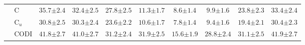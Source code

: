 \begin{table}[!h]
\begin{tabular}{ll c ccc ccc c}
 & C & $35.7 {\scriptstyle \pm 2.4}$ & $32.4 {\scriptstyle \pm 2.5}$ & $27.8 {\scriptstyle \pm 2.5}$ & $11.3 {\scriptstyle \pm 1.7}$ & $8.6 {\scriptstyle \pm 1.4}$ & $9.9 {\scriptstyle \pm 1.6}$ & $23.8 {\scriptstyle \pm 2.3}$ & $33.4 {\scriptstyle \pm 2.4}$ \\
 & C$_u$ & $30.8 {\scriptstyle \pm 2.5}$ & $30.3 {\scriptstyle \pm 2.4}$ & $23.6 {\scriptstyle \pm 2.2}$ & $10.6 {\scriptstyle \pm 1.7}$ & $7.8 {\scriptstyle \pm 1.4}$ & $9.4 {\scriptstyle \pm 1.6}$ & $19.4 {\scriptstyle \pm 2.1}$ & $30.4 {\scriptstyle \pm 2.3}$ \\
 & CODI & $41.8 {\scriptstyle \pm 2.7}$ & $41.0 {\scriptstyle \pm 2.7}$ & $31.2 {\scriptstyle \pm 2.4}$ & $31.9 {\scriptstyle \pm 2.5}$ & $15.6 {\scriptstyle \pm 1.9}$ & $28.8 {\scriptstyle \pm 2.4}$ & $31.1 {\scriptstyle \pm 2.5}$ & $41.9 {\scriptstyle \pm 2.7}$ \\
\bottomrule
\end{tabular}
\end{table}